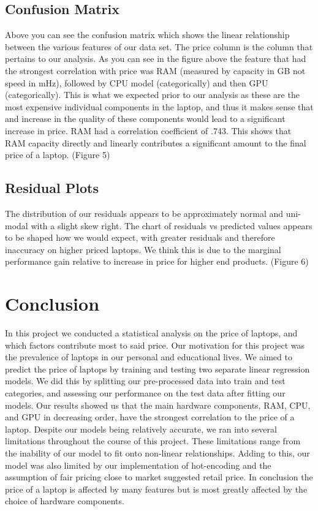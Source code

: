 \documentclass{article}
\begin{document}
\subsection{Confusion Matrix}
Above you can see the confusion matrix which shows the linear relationship between the various features of our data set. The price column is the column that pertains to our analysis. As you can see in the figure above the feature that had the strongest correlation with price was RAM (measured by capacity in GB not speed in mHz), followed by CPU model (categorically) and then GPU (categorically). This is what we expected prior to our analysis as these are the most expensive individual components in the laptop, and thus it makes sense that and increase in the quality of these components would lead to a significant increase in price. RAM had a correlation coefficient of .743. This shows that RAM capacity directly and linearly contributes a significant amount to the final price of a laptop. (Figure 5)

\subsection{Residual Plots}
The distribution of our residuals appears to be approximately normal and uni-modal with a slight skew right. The chart of residuals vs predicted values appears to be shaped how we would expect, with greater residuals and therefore inaccuracy on higher priced laptops. We think this is due to the marginal performance gain relative to increase in price for higher end products. (Figure 6)


\section{Conclusion}
In this project we conducted a statistical analysis on the price of laptops, and which factors contribute most to said price. Our motivation for this project was the prevalence of laptops in our personal and educational lives. We aimed to predict the price of laptops by training and testing two separate linear regression models. We did this by splitting our pre-processed data into train and test categories, and assessing our performance on the test data after fitting our models. Our results showed us that the main hardware components, RAM, CPU, and GPU in decreasing order, have the strongest correlation to the price of a laptop. Despite our models being relatively accurate, we ran into several limitations throughout the course of this project. These limitations range from the inability of our model to fit onto non-linear relationships. Adding to this, our model was also limited by our implementation of hot-encoding and the assumption of fair pricing close to market suggested retail price. In conclusion the price of a laptop is affected by many features but is most greatly affected by the choice of hardware components. 
\end{document}
